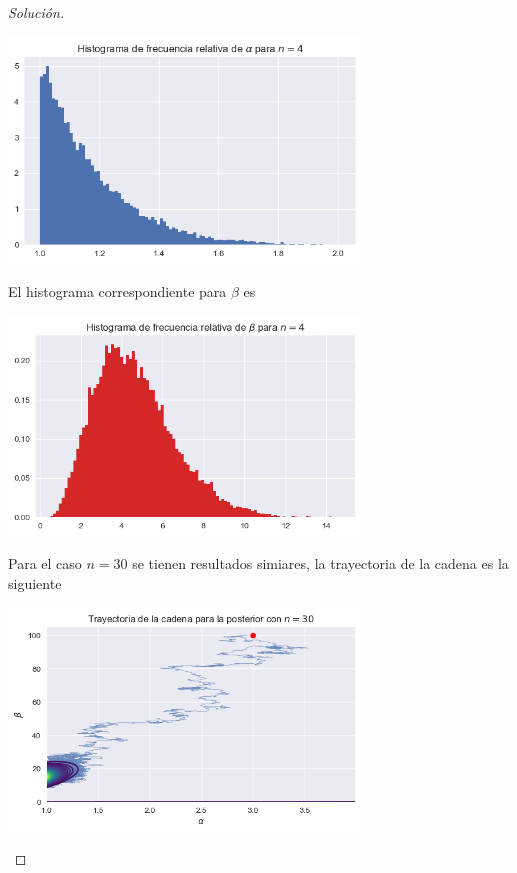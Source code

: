 \documentclass{article}
\begin{document}
\begin{enumerate}
\begin{proof}[Solución]
        \begin{center}
            \includegraphics[width=0.7\textwidth]{tarea7/histalpha4.png}
        \end{center}

        El histograma correspondiente para $\beta$ es

        \begin{center}
            \includegraphics[width=0.7\textwidth]{tarea7/histbeta4.png}
        \end{center}

        Para el caso $n=30$ se tienen resultados simiares, la trayectoria de la cadena es la
        siguiente

        \begin{center}
            \includegraphics[width=0.7\textwidth]{tarea7/gamma30_norm.png}
        \end{center}


\end{proof}
\end{enumerate}
\end{document}
